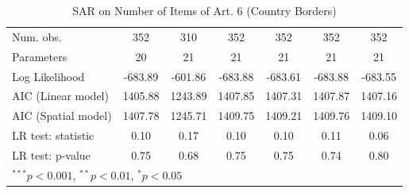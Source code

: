 \begin{table}[!h]
\begin{center}
\begin{tabular}{l c c c c c c }
Num. obs.               & 352           & 310          & 352           & 352           & 352           & 352           \\
Parameters              & 20            & 21           & 21            & 21            & 21            & 21            \\
Log Likelihood          & -683.89       & -601.86      & -683.88       & -683.61       & -683.88       & -683.55       \\
AIC (Linear model)      & 1405.88       & 1243.89      & 1407.85       & 1407.31       & 1407.87       & 1407.16       \\
AIC (Spatial model)     & 1407.78       & 1245.71      & 1409.75       & 1409.21       & 1409.76       & 1409.10       \\
LR test: statistic      & 0.10          & 0.17         & 0.10          & 0.10          & 0.11          & 0.06          \\
LR test: p-value        & 0.75          & 0.68         & 0.75          & 0.75          & 0.74          & 0.80          \\
\bottomrule
\multicolumn{7}{l}{\scriptsize{$^{***}p<0.001$, $^{**}p<0.01$, $^*p<0.05$}}
\end{tabular}
\caption{SAR on Number of Items of Art. 6 (Country Borders)}
\label{table:coefficients}
\end{center}
\end{table}
